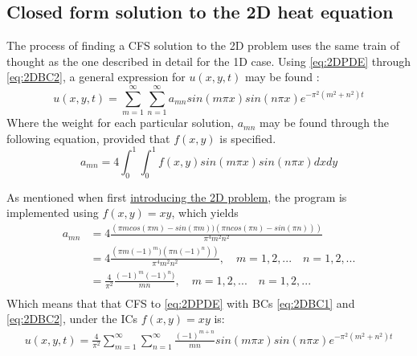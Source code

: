 \documentclass[%
oneside,                 %
final,                   %
10pt]{article}
\begin{document}
\subsection{Closed form solution to the 2D heat equation}
\label{M.CFS2D}
The process of finding a CFS solution to the 2D problem uses the same train of thought as the one described in detail for the 1D case. Using \eqref{eq:2DPDE} through \eqref{eq:2DBC2}, a general expression for $u(x,y,t)$ may be found \cite[pp. 284-286]{ravi}:
\begin{equation}
u(x,y,t)=\sum_{m=1}^{\infty} \sum_{n=1}^{\infty} a_{mn} sin(m \pi x) sin (n \pi x) e^{-\pi^2(m^2+n^2)t} 
\end{equation}
Where the weight for each particular solution, $a_{mn}$ may be found through the following equation, provided that $f(x,y)$ is specified.
\begin{equation}
a_{mn}=4 \int_0^1 \int_0^1 f(x,y)  sin(m \pi x) sin(n \pi x) dx dy 
\end{equation}

As mentioned when first \hyperref[M.2dmod]{introducing the 2D problem}, the program is implemented using $f(x,y)=xy$, which yields
\begin{align*}
a_{mn}&=4 \frac{\left(\pi m cos(\pi m) - sin(\pi m)) (\pi n cos(\pi n) - sin(\pi n))\right)}{\pi^4 m^2 n^2}\\
&=4 \frac{\left(\pi m (-1)^m) (\pi n (-1)^n)\right)}{\pi^4 m^2 n^2}, \quad m=1,2,... \quad n=1,2,...\\
&=\frac{4}{\pi^2} \frac{ (-1)^m  (-1)^n)}{ m n}, \quad m=1,2,... \quad n=1,2,...\\
\end{align*}
Which means that that CFS to \eqref{eq:2DPDE} with BCs \eqref{eq:2DBC1} and \eqref{eq:2DBC2}, under the ICs $f(x,y)=xy$ is:
\begin{align}
u(x,y,t)= \frac{4}{\pi^2} \sum_{m=1}^{\infty} \sum_{n=1}^{\infty} \frac{ (-1)^{m+n}}{ m n} sin(m \pi x) sin (n \pi x) e^{-\pi^2(m^2+n^2)t}
\end{align}
\end{document}
